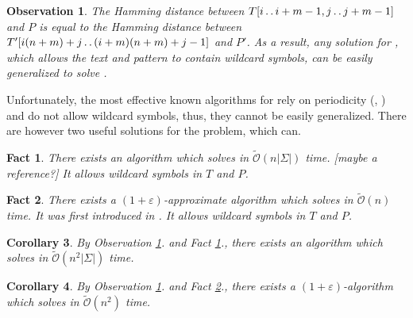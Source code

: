 \documentclass[11pt]{article}
\def\dd{\mathinner{.\,.}}
\newcommand{\tO}{\tilde{\mathcal{O}}}
\theoremstyle{plain}
\newtheorem{fact}{Fact}
\newtheorem{corollary}[fact]{Corollary}
\newtheorem{observation}{Observation}
\theoremstyle{definition}
\begin{document}
\begin{observation}\label{wildcard reduction}
	The Hamming distance between $T[i \dd i + m - 1, j \dd j + m - 1]$ and $P$ is equal to the Hamming distance between $T'[i(n + m) + j \dd (i + m)(n + m) + j - 1]$ and $P'$.
	As a result, any solution for \hd, which allows the text and pattern to contain wildcard symbols, can be easily generalized to solve \HD.
\end{observation}

Unfortunately, the most effective known algorithms for \hd rely on periodicity (\cite{Clifford2015}, \cite{Gawrychowski2017}) and do not allow wildcard symbols, thus, they cannot be easily generalized.
There are however two useful solutions for the \hd problem, which can.

\begin{fact}\label{sigman}
	There exists an algorithm which solves \hd in $\tO(n|\Sigma|)$ time.
	[maybe a reference?]
	It allows wildcard symbols in $T$ and $P$. 
\end{fact}

\begin{fact}\label{approx}
	There exists a $(1 + \varepsilon)$-approximate algorithm which solves \hd in $\tO(n)$ time.
	It was first introduced in \cite{Karloff1993}.
	It allows wildcard symbols in $T$ and $P$.
\end{fact}

\begin{corollary}
	By Observation \ref{wildcard reduction}. and Fact \ref{sigman}., there exists an algorithm which solves \HD in $\tO(n^2|\Sigma|)$ time.
\end{corollary}

\begin{corollary}
	By Observation \ref{wildcard reduction}. and Fact \ref{approx}., there exists a $(1 + \varepsilon)$-algorithm which solves \HD in $\tO(n^2)$ time.
\end{corollary}
\end{document}
